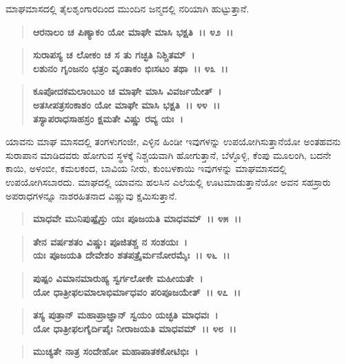 ಮಾಘಮಾಸದಲ್ಲಿ ತೈಲಶೃಂಗಾರದಿಂದ ಮುಂದಿನ ಜನ್ಮದಲ್ಲಿ ನರಿಯಾಗಿ ಹುಟ್ಟುತ್ತಾನೆ.

\begin{verse}
\textbf{ಆರನಾಲಂ ಚ ಪಿಣ್ಯಾಕಂ ಯೋ ಮಾಘೇ ಮಾಸಿ ಭಕ್ಷತಿ~।। ೪೨~।।}
\end{verse}

\begin{verse}
\textbf{ಸುರಾಪಸ್ಯ ಚ ಲೋಕಂ ಚ ಸ ತು ಗಚ್ಛತಿ ನಿಶ್ಚಿತಮ್~।}\\\textbf{ಲಶುನಂ ಗೃಂಜನಂ ಛತ್ರಂ ವೃಂತಾಕಂ ಭಿಃಸಟಂ ತಥಾ~।। ೪೩~।। }
\end{verse}

\begin{verse}
\textbf{ಕೂಪೋದಕಮಲಾಂಬುಂ ಚ ಮಾಘೇ ಮಾಸಿ ವಿವರ್ಜಯೇತ್~।}\\\textbf{ಅತಸೀಪತ್ರಸಂಕಾಶಂ ಯೋ ಮಾಘೇ ಮಾಸಿ ಭಕ್ಷತಿ~।। ೪೪~।। }\\\textbf{ತಸ್ಯಾಪರಾಧಸಾಹಸ್ರಂ ಕ್ಷಮತೇ ವಿಷ್ಣು ರವ್ಯ ಯಃ~।}
\end{verse}

ಯಾವನು ಮಾಘ ಮಾಸದಲ್ಲಿ ತಂಗಳುಗಂಜೀ, ಎಳ್ಳಿನ ಹಿಂಡೀ ಇವುಗಳನ್ನು ಉಪಯೋಗಿಸುತ್ತಾನೆಯೋ ಅಂತಹವನು ಸುರಾಪಾನ ಮಾಡಿದವರು ಹೋಗುವ ಸ್ಥಳಕ್ಕೆ ನಿಶ್ಚಯವಾಗಿ ಹೋಗುತ್ತಾನೆ, ಬೆಳ್ಳೊಳ್ಳಿ, ಕೆಂಪು ಮೂಲಂಗಿ, ಬದನೇ ಕಾಯಿ, ಅಳಂಬೀ, ಕಮಲಕಂದ, ಬಾವಿಯ ನೀರು, ಕುಂಬಳಕಾಯಿ ಇವುಗಳನ್ನು ಮಾಘಮಾಸದಲ್ಲಿ ಉಪಯೋಗಿಸಬಾರದು. ಮಾಘದಲ್ಲಿ ಯಾವನು ಹಲಸಿನ ಎಲೆಯಲ್ಲಿ ಊಟಮಾಡುತ್ತಾನೆಯೋ ಅವನ ಸಹಸ್ರಾರು ಅಪರಾಧಗಳನ್ನೂ ನಾಶರಹಿತನಾದ ವಿಷ್ಣುವು ಕ್ಷಮಿಸುತ್ತಾನೆ.

\begin{verse}
\textbf{ಮಾಧವೇ ಮುನಿಪುಷ್ಪೈಸ್ತು ಯಃ ಪೂಜಯತಿ ಮಾಧವಮ್~।। ೪೫~।। }
\end{verse}

\begin{verse}
\textbf{ತೇನ ವರ್ಷಶತಂ ವಿಷ್ಣುಃ ಪೂಜಿತಶ್ಚ ನ ಸಂಶಯಃ~।}\\\textbf{ಯಃ ಪೂಜಯತಿ ದೇವೇಶಂ ಶತಪತ್ರೈರ್ಮನೋರಮೈಃ~।। ೪೬~।। }
\end{verse}

\begin{verse}
\textbf{ಪುಷ್ಪಂ ವಿಮಾನಮಾರುಹ್ಯ ಸ್ವರ್ಗಲೋಕೇ ಮಹೀಯತೇ~।}\\\textbf{ಯೋ ಧಾತ್ರೀಫಲಮಾಲಾಭಿರ್ಮಾಧವಂ ಪರಿಪೂಜಯೇತ್~।। ೪೭~।। }
\end{verse}

\begin{verse}
\textbf{ತಸ್ಯ ಪುತ್ರಾನ್ ಮಹಾಪ್ರಾಜ್ಞಾನ್ ಸ್ವಯಂ ಯಚ್ಛತಿ ಮಾಧವಃ~।}\\\textbf{ಯೋ ಧಾತ್ರೀಫಲಗೈರ್ದಿಪೈಃ ನೀರಾಜಯತಿ ಮಾಧವಮ್~।। ೪೮~।। }
\end{verse}

\begin{verse}
\textbf{ಮುಚ್ಯತೇ ನಾತ್ರ ಸಂದೇಹೋ ಮಹಾಪಾತಕಕೋಟಿಭಿಃ~।}
\end{verse}

